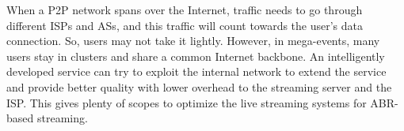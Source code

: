 When a \ac{P2P} network spans over the Internet, traffic needs to go through different \acp{ISP} and \acp{AS}, and this traffic will count towards the user's data connection. So, users may not take it lightly. However, in mega-events, many users stay in clusters and share a common Internet backbone. An intelligently developed service can try to exploit the internal network to extend the service and provide better quality with lower overhead to the streaming server and the ISP. This gives plenty of scopes to optimize the live streaming systems for \ac{ABR}-based streaming.